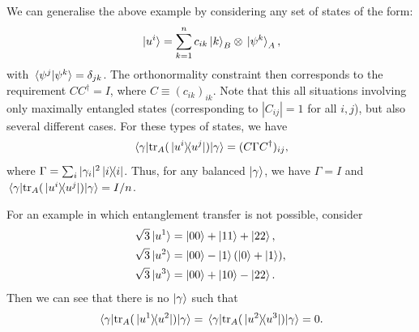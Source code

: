 \documentclass[
	aps, pra,
	superscriptaddress, twocolumn,
	floatfix,
	10pt
]{revtex4-1}
\newcommand{\parTitle}[1]{\noindent{\color{Mahogany}(\emph{#1})}}
\renewcommand{\parTitle}[1]{}
\begin{document}
\parTitle{Example 2}
We can generalise the above example by considering any set of states of the form:
\begin{equation}
    \ket*{u^i} = \sum_{k=1}^n c_{ik} \ket{k}_B\otimes\ket*{\psi^{k}}_A,
\end{equation}
with $\braket*{\psi^j}{\psi^k}=\delta_{jk}$.
The orthonormality constraint then corresponds to the requirement $CC^\dagger=I$, where $C\equiv(c_{ik})_{ik}$.
Note that this all situations involving only maximally entangled states (corresponding to $|C_{ij}|=1$ for all $i,j$), but also several different cases.
For these types of states, we have
\begin{equation}
    \mel*{\gamma}{\tr_A(\ketbra*{u^i}{u^j})}{\gamma} =
    (C\Gamma C^\dagger)_{ij},
\end{equation}
where $\Gamma=\sum_i |\gamma_i|^2 \ketbra i$.
Thus, for any balanced $\ket\gamma$, we have $\Gamma=I$ and 
$\mel*{\gamma}{\tr_A(\ketbra*{u^i}{u^j})}{\gamma}=I/n$.

\parTitle{Example 3}
For an example in which entanglement transfer is not possible, consider
\begin{equation}
\begin{aligned}
    \sqrt3\ket*{u^1} &= \ket{00} + \ket{11} + \ket{22}, \\
    \sqrt3\ket*{u^2} &= \ket{00} - \ket{1}(\ket0+\ket1), \\
    \sqrt3\ket*{u^3} &= \ket{00} + \ket{10} - \ket{22}.
\end{aligned}
\end{equation}
Then we can see that there is no $\ket\gamma$ such that
\begin{equation}
    \mel*{\gamma}{\tr_A(\ketbra*{u^1}{u^2})}{\gamma} =
    \mel*{\gamma}{\tr_A(\ketbra*{u^2}{u^3})}{\gamma} = 0.
\end{equation}
\end{document}
